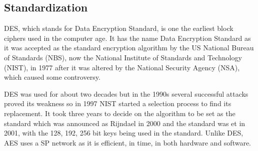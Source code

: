 \documentclass[12pt,twoside,a4paper]{report}
\begin{document}
    \subsection{Standardization}
    DES, which stands for Data Encryption Standard, is one the earliest block ciphers used in the computer age.
    It has the name Data Encryption Standard as it was accepted as the standard encryption algorithm by the US National Bureau of Standards (NBS), now the National Institute of Standards and Technology (NIST), in 1977 after it was altered by the National Security Agency (NSA), which caused some controversy\cite{ComputerSecurityDivision1999}.
    
    DES was used for about two decades but in the 1990s several successful attacks proved its weakness\cite{Team} so in 1997 NIST started a selection process to find its replacement.
    It took three years to decide on the algorithm to be set as the standard which was announced as Rijndael in 2000 and the standard was et in 2001, with the 128, 192, 256 bit keys being used in the standard\cite{ComputerSecurityDivision2001}.
    Unlike DES, AES uses a SP network as it is efficient, in time, in both hardware and software.
    
\end{document}

